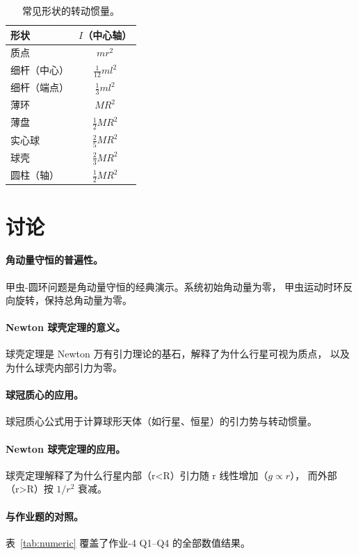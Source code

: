 \documentclass[UTF8,a4paper,11pt]{ctexart}
\begin{document}
\begin{table}[htbp]
\centering
\small
\begin{tabular}{p{4cm}c}
\toprule
形状 & $I$（中心轴） \\
\midrule
质点 & $mr^2$ \\
细杆（中心） & $\frac{1}{12}ml^2$ \\
细杆（端点） & $\frac{1}{3}ml^2$ \\
薄环 & $MR^2$ \\
薄盘 & $\frac12 MR^2$ \\
实心球 & $\frac25 MR^2$ \\
球壳 & $\frac23 MR^2$ \\
圆柱（轴） & $\frac12 MR^2$ \\
\bottomrule
\end{tabular}
\caption{常见形状的转动惯量。}
\label{tab:inertia}
\end{table}

\section{讨论}
\label{sec:discuss}

\paragraph{角动量守恒的普遍性。}
甲虫-圆环问题是角动量守恒的经典演示。系统初始角动量为零，
甲虫运动时环反向旋转，保持总角动量为零。

\paragraph{Newton 球壳定理的意义。}
球壳定理是 Newton 万有引力理论的基石，解释了为什么行星可视为质点，
以及为什么球壳内部引力为零。

\paragraph{球冠质心的应用。}
球冠质心公式用于计算球形天体（如行星、恒星）的引力势与转动惯量。

\paragraph{Newton 球壳定理的应用。}
球壳定理解释了为什么行星内部（r<R）引力随 r 线性增加（$g\propto r$），
而外部（r>R）按 $1/r^2$ 衰减。

\paragraph{与作业题的对照。}
表~\ref{tab:numeric} 覆盖了作业-4 Q1--Q4 的全部数值结果。
\end{document}
